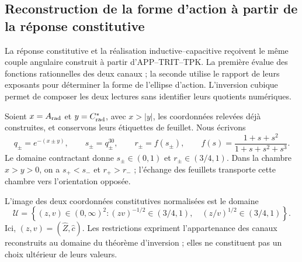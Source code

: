 \subsection{Reconstruction de la forme d’action à partir de la réponse constitutive}
\label{iii:iii:subsec:puente-forma-LC}

La réponse constitutive et la réalisation inductive--capacitive reçoivent
le même couple angulaire construit à partir d’APP--TRIT--TPK. La première évalue
des fonctions rationnelles des deux canaux ; la seconde utilise le rapport de
leurs exposants pour déterminer la forme de l’ellipse d’action.
L’inversion cubique permet de composer les deux lectures sans identifier leurs
quotients numériques.

Soient $x=A_{\rm rad}$ et $y=C^*_{\rm rad}$, avec $x>|y|$, les coordonnées
relevées déjà construites, et conservons leurs étiquettes de feuillet. Nous écrivons
\begin{equation}
 q_\pm=e^{-(x\pm y)},\qquad s_\pm=q_\pm^{30},\qquad
 r_\pm=f(s_\pm),\qquad
 f(s)=\frac{1+s+s^2}{1+s+s^2+s^3}.
 \label{iii:iii:eq:forma-canales}
\end{equation}
Le domaine contractant donne $s_\pm\in(0,1)$ et $r_\pm\in(3/4,1)$. Dans la chambre $x>y>0$, on a $s_+<s_-$ et $r_+>r_-$ ; l'échange des feuillets transporte cette chambre vers l'orientation opposée.

L’image des deux coordonnées constitutives normalisées est le domaine
\begin{equation}
 \mathcal U=\left\{(z,v)\in(0,\infty)^2:
   (zv)^{-1/2}\in(3/4,1),\quad
   (z/v)^{1/2}\in(3/4,1)\right\}.
 \label{iii:iii:eq:forma-dominio}
\end{equation}
Ici, $(z,v)=(\widehat Z,\widehat c)$. Les restrictions expriment l'appartenance des canaux reconstruits au domaine du théorème d'inversion ; elles ne constituent pas un choix ultérieur de leurs valeurs.

